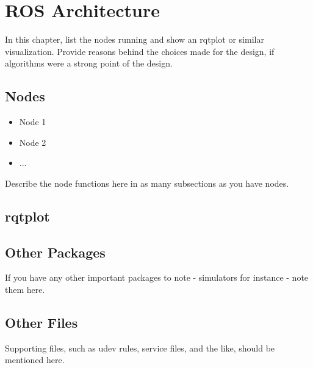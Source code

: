 
\chapter{ROS Architecture}
\label{chap:rosarch}

In this chapter, list the nodes running and show an rqtplot or similar visualization. Provide reasons behind the choices made for the design, if algorithms were a strong point of the design.

\section{Nodes}

\begin{itemize}
\item{Node 1}
\item{Node 2}
\item{...}
\end{itemize}


Describe the node functions here in as many subsections as you have nodes.

\section{rqtplot}


\section{Other Packages}

If you have any other important packages to note - simulators for instance - note them here.

\section{Other Files}

Supporting files, such as udev rules, service files, and the like, should be mentioned here.
